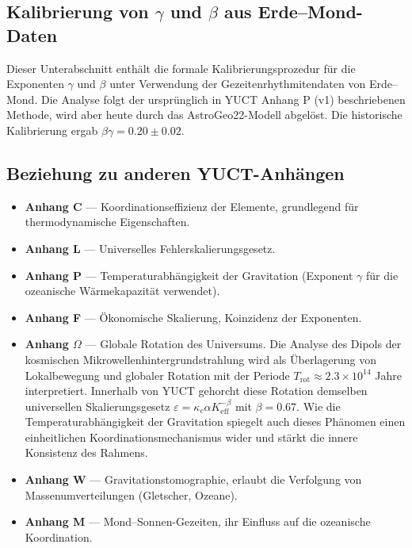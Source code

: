 \documentclass[12pt]{article}
\theoremstyle{remark}
\begin{document}
	\subsection{Kalibrierung von \(\gamma\) und \(\beta\) aus Erde–Mond-Daten}\label{subsec:earth-moon-calibration}
	Dieser Unterabschnitt enthält die formale Kalibrierungsprozedur für die Exponenten \(\gamma\) und \(\beta\) unter Verwendung der Gezeitenrhythmitendaten von Erde–Mond. Die Analyse folgt der ursprünglich in YUCT Anhang P (v1) beschriebenen Methode, wird aber heute durch das AstroGeo22-Modell abgelöst. Die historische Kalibrierung ergab \(\beta\gamma = 0.20 \pm 0.02\).
	
	\subsection{Beziehung zu anderen YUCT-Anhängen}
	
	\begin{itemize}
		\item \textbf{Anhang C} — Koordinationseffizienz der Elemente, grundlegend für thermodynamische Eigenschaften.
		\item \textbf{Anhang L} — Universelles Fehlerskalierungsgesetz.
		\item \textbf{Anhang P} — Temperaturabhängigkeit der Gravitation (Exponent \(\gamma\) für die ozeanische Wärmekapazität verwendet).
		\item \textbf{Anhang F} — Ökonomische Skalierung, Koinzidenz der Exponenten.
		\item \textbf{Anhang \(\Omega\)} — Globale Rotation des Universums. Die Analyse des Dipols der kosmischen Mikrowellenhintergrundstrahlung wird als Überlagerung von Lokalbewegung und globaler Rotation mit der Periode \(T_{\mathrm{rot}} \approx 2.3\times10^{14}\) Jahre interpretiert. Innerhalb von YUCT gehorcht diese Rotation demselben universellen Skalierungsgesetz \(\varepsilon = \kappa_c \alpha K_{\mathrm{eff}}^{-\beta}\) mit \(\beta = 0.67\). Wie die Temperaturabhängigkeit der Gravitation spiegelt auch dieses Phänomen einen einheitlichen Koordinationsmechanismus wider und stärkt die innere Konsistenz des Rahmens.
		\item \textbf{Anhang W} — Gravitationstomographie, erlaubt die Verfolgung von Massenumverteilungen (Gletscher, Ozeane).
		\item \textbf{Anhang M} — Mond–Sonnen-Gezeiten, ihr Einfluss auf die ozeanische Koordination.
	\end{itemize}
	
\end{document}
